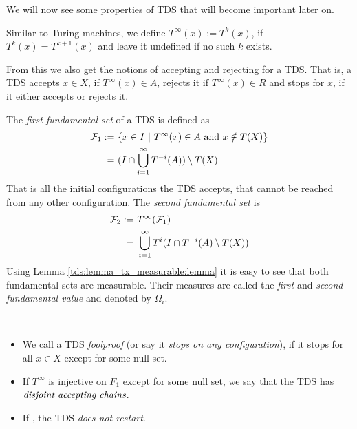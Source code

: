We will now see some properties of TDS that will become important later on.

Similar to Turing machines, we define $T^\infty(x):=T^k(x)$, if $T^k(x)=T^{k+1}(x)$ and leave it undefined if no such $k$ exists.

From this we also get the notions of accepting and rejecting for a TDS.
That is, a TDS accepts $x \in X$, if $T^\infty(x) \in A$,
rejects it if $T^\infty(x) \in R$ 
and stops for $x$, if it either accepts or rejects it.

\begin{Definition}
	The \emph{first fundamental set} of a TDS is defined as
	\begin{align*}
		\mathcal{F}_1 :=&~\{ x \in I~|~T^\infty(x) \in A~\text{and}~x \notin T(X) \} \\
		=&~(I \cap \bigcup_{i=1}^\infty T^{-i}(A)) \setminus T(X)
	\end{align*}
	That is all the initial configurations the TDS accepts, that cannot be reached from any other configuration.
	The \emph{second fundamental set} is
	\begin{align*}
		\mathcal{F}_2 :=&~T^\infty(\mathcal{F}_1) \\
		=&~\bigcup_{i=1}^\infty T^i( I \cap T^{-i}(A) \setminus T(X))
	\end{align*}
	Using Lemma \ref{tds:lemma_tx_measurable:lemma} it is easy to see that both fundamental sets are measurable.
	Their measures are called the \emph{first} and \emph{second fundamental value} and denoted by $\Omega_i$.
\end{Definition}


\begin{Definition}
	\
	\begin{itemize}
		\item We call a TDS \emph{foolproof} (or say it \emph{stops on any configuration}), if it stops for all $x \in X$ except for some null set.

		\item If $T^\infty$ is injective on $F_1$ except for some null set, we say that the TDS has $\emph{disjoint accepting chains}$.

		\item If , the TDS \emph{does not restart}.
	\end{itemize}
\end{Definition}
